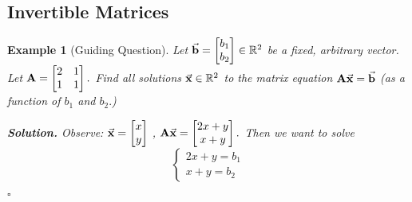 \documentclass[12pt, a4paper]{article}
\newtheorem{eg}{Example}[subsection]
\newenvironment*{sol}{\par\indent\textbf{\textit{Solution. }}}{\hfill{$\square$}\par}
\def\R{{\mathbb{R}}}
\def\vecx{\va{x}}
\def\vecb{\va{b}}
\def\matrixA{\vb{A}}
\begin{document}
\subsection{Invertible Matrices}
\begin{eg}[Guiding Question]
	Let $\vecb=\begin{bmatrix}b_1\\b_2\end{bmatrix}\in\R^2$ be a fixed, arbitrary vector. Let $\matrixA=\begin{bmatrix}2&1\\1&1\end{bmatrix}.$ Find all solutions $\vecx\in\R^2$ to the matrix equation $\matrixA\vecx=\vecb$ (as a function of $b_1$ and $b_2.$)
	
	\begin{sol}
		Observe: $\vecx=\begin{bmatrix}x\\y\end{bmatrix}$	, $\matrixA\vecx=\begin{bmatrix}2x+y\\x+y\end{bmatrix}.$ Then we want to solve \[\begin{cases}2x+y=b_1\\x+y=b_2\end{cases}\]

\end{sol}
\end{eg}
\end{document}
